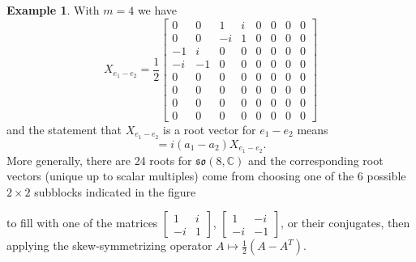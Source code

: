 \documentclass[reqno]{amsart}
\theoremstyle{definition} \newtheorem{example}[theorem]{Example}
\newcommand{\CC}{\mathbb{C}}
\newcommand{\so}{\mathfrak{so}}
\begin{document}
\begin{example}
With $m = 4$ we have
\begin{equation*}
X_{e_1-e_2} = \frac{1}{2}\left[\begin{smallmatrix}
0 & 0 & 1 & i & 0 & 0 & 0 & 0\\
0 & 0 & -i & 1 & 0 & 0 & 0 & 0\\
-1 & i & 0 & 0 & 0 & 0 & 0 & 0\\
-i & -1 & 0 & 0 & 0 & 0 & 0 & 0\\
0 & 0 & 0 & 0 & 0 & 0 & 0 & 0\\
0 & 0 & 0 & 0 & 0 & 0 & 0 & 0\\
0 & 0 & 0 & 0 & 0 & 0 & 0 & 0\\
0 & 0 & 0 & 0 & 0 & 0 & 0 & 0
\end{smallmatrix}\right]
\end{equation*}
and the statement that $X_{e_1-e_2}$ is a root vector for $e_1-e_2$ means
\begin{equation*}
[a_1 H_1 + a_2 H_2 + a_3 H_3 + a_4 H_4, X_{e_1-e_2}] = i(a_1-a_2)X_{e_1-e_2}.
\end{equation*}
More generally, there are 24 roots for $\so(8,\CC)$ and the corresponding root vectors (unique up to scalar multiples) come from choosing one of the 6 possible $2 \times 2$ subblocks indicated in the figure 
\begin{center}
\end{center}
to fill with one of the matrices $\left[ \begin{smallmatrix} 1 & i \\ -i & 1 \end{smallmatrix}\right]$, $\left[ \begin{smallmatrix} 1 & -i \\ -i & -1 \end{smallmatrix}\right]$, or their conjugates, then applying the skew-symmetrizing operator $A \mapsto \tfrac{1}{2}(A-A^T)$.
\end{example}
\end{document}
